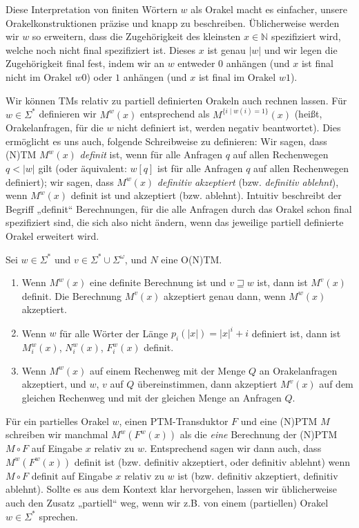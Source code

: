 Diese Interpretation von finiten Wörtern $w$ als Orakel macht es einfacher, unsere Orakelkonstruktionen präzise und knapp zu beschreiben. Üblicherweise werden wir $w$ so erweitern, dass die Zugehörigkeit des kleinsten $x\in\mathbb N$ spezifiziert wird, welche noch nicht final spezifiziert ist. Dieses $x$ ist genau $|w|$ und wir legen die Zugehörigkeit final fest, indem wir an $w$ entweder $0$ anhängen (und $x$ ist final nicht im Orakel $w0$) oder $1$ anhängen (und $x$ ist final im Orakel $w1$).


Wir können TMs relativ zu partiell definierten Orakeln auch rechnen lassen. Für $w\in\Sigma^*$ definieren wir $M^w(x)$ entsprechend als $M^{\{i\mid w(i)=1\}}(x)$ (heißt, Orakelanfragen, für die $w$ nicht definiert ist, werden negativ beantwortet).
Dies ermöglicht es uns auch, folgende Schreibweise zu definieren: Wir sagen, dass (N)TM $M^w(x)$ \emph{definit} ist, wenn für alle Anfragen $q$ auf allen Rechenwegen $q<|w|$ gilt (oder äquivalent: $w[q]$ ist für alle Anfragen $q$ auf allen Rechenwegen definiert); wir sagen, dass $M^w(x)$ \emph{definitiv akzeptiert} (bzw. \emph{definitiv ablehnt}), wenn $M^w(x)$ definit ist und akzeptiert (bzw. ablehnt). Intuitiv beschreibt der Begriff „definit“ Berechnungen, für die alle Anfragen durch das Orakel schon final spezifiziert sind, die sich also nicht ändern, wenn das jeweilige partiell definierte Orakel erweitert wird.
\begin{observation}\label{obs:partialoracles}
    Sei $w\in\Sigma^*$ und $v\in\Sigma^*\cup\Sigma^\omega$, und $N$ eine O(N)TM.
    \begin{enumerate}
        \item Wenn $M^w(x)$ eine definite Berechnung ist und $v\sqsupseteq w$ ist, dann ist $M^v(x)$ definit. Die Berechnung $M^v(x)$ akzeptiert genau dann, wenn $M^w(x)$ akzeptiert.
        \item Wenn $w$ für alle Wörter der Länge $p_i(|x|)=|x|^i+i$ definiert ist, dann ist $M_i^w(x)$, $N_i^w(x)$, $F_i^w(x)$ definit.
        \item Wenn $M^w(x)$ auf einem Rechenweg mit der Menge $Q$ an Orakelanfragen akzeptiert, und $w$, $v$ auf $Q$ übereinstimmen, dann akzeptiert $M^v(x)$ auf dem gleichen Rechenweg und mit der gleichen Menge an Anfragen $Q$.
    \end{enumerate}
\end{observation}

Für ein partielles Orakel $w$, einen PTM-Transduktor $F$ und eine (N)PTM $M$ schreiben wir manchmal $M^w(F^w(x))$ als die \emph{eine} Berechnung der (N)PTM $M\circ F$ auf Eingabe $x$ relativ zu $w$.
Entsprechend sagen wir dann auch, dass $M^w(F^w(x))$ definit ist (bzw. definitiv akzeptiert, oder definitiv ablehnt) wenn $M\circ F$ definit auf Eingabe $x$ relativ zu $w$ ist (bzw. definitiv akzeptiert, definitiv ablehnt).
Sollte es aus dem Kontext klar hervorgehen, lassen wir üblicherweise auch den Zusatz „partiell“ weg, wenn wir z.B. von einem (partiellen) Orakel $w\in\Sigma^*$ sprechen.

